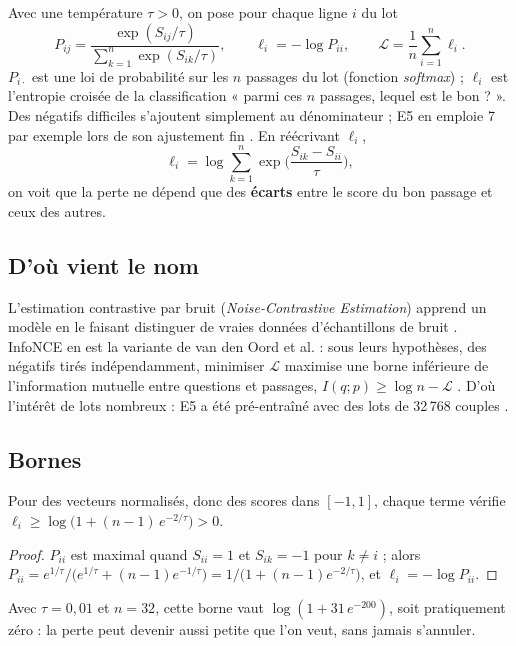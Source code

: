 Avec une température $\tau > 0$, on pose pour chaque ligne $i$ du lot
\[
  P_{ij} = \frac{\exp(S_{ij}/\tau)}{\sum_{k=1}^{n} \exp(S_{ik}/\tau)},
  \qquad
  \ell_i = -\log P_{ii},
  \qquad
  \mathcal{L} = \frac{1}{n}\sum_{i=1}^{n} \ell_i .
\]
$P_{i\cdot}$ est une loi de probabilité sur les $n$ passages du lot (fonction \emph{softmax}) ; $\ell_i$ est
l'entropie croisée de la classification « parmi ces $n$ passages, lequel est le bon ? ». Des négatifs difficiles
s'ajoutent simplement au dénominateur ; E5 en emploie 7 par exemple lors de son ajustement fin \source. En
réécrivant $\ell_i$,
\[
  \ell_i = \log \sum_{k=1}^{n} \exp\!\Big(\frac{S_{ik} - S_{ii}}{\tau}\Big),
\]
on voit que la perte ne dépend que des \textbf{écarts} entre le score du bon passage et ceux des autres.

\subsection{D'où vient le nom}

L'estimation contrastive par bruit (\emph{Noise-Contrastive Estimation}) apprend un modèle en le faisant distinguer
de vraies données d'échantillons de bruit \source. InfoNCE en est la variante de van den Oord et al. : sous leurs
hypothèses, des négatifs tirés indépendamment, minimiser $\mathcal{L}$ maximise une borne inférieure de
l'information mutuelle entre questions et passages, $I(q; p) \ge \log n - \mathcal{L}$ \source. D'où l'intérêt de
lots nombreux : E5 a été pré-entraîné avec des lots de 32\,768 couples \source.

\subsection{Bornes}

\begin{proposition}\label{prop:bornes}
Pour des vecteurs normalisés, donc des scores dans $[-1, 1]$, chaque terme vérifie
$\ell_i \ge \log\big(1 + (n-1)\,e^{-2/\tau}\big) > 0$.
\end{proposition}

\begin{proof}
$P_{ii}$ est maximal quand $S_{ii} = 1$ et $S_{ik} = -1$ pour $k \neq i$ ; alors
$P_{ii} = e^{1/\tau} / \big(e^{1/\tau} + (n-1)e^{-1/\tau}\big) = 1 / \big(1 + (n-1)e^{-2/\tau}\big)$, et
$\ell_i = -\log P_{ii}$.
\end{proof}

Avec $\tau = 0{,}01$ et $n = 32$, cette borne vaut $\log(1 + 31\,e^{-200})$, soit pratiquement zéro : la perte peut
devenir aussi petite que l'on veut, sans jamais s'annuler.

